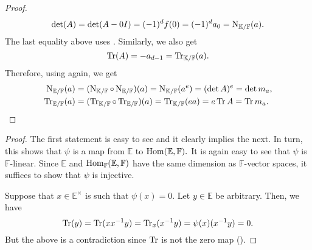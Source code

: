 \begin{proof}
    \begin{equation*} 
        \det(A) = \det(A - 0I) = (-1)^df(0) = (-1)^d a_0 = \operatorname{N}_{\mathbb{K}/\mathbb{F}}(a).
    \end{equation*}
    The last equality above uses . Similarly, we also get
    \begin{equation*} 
        \operatorname{Tr}(A) = -a_{d - 1} = \operatorname{Tr}_{\mathbb{K}/\mathbb{F}}(a).
    \end{equation*}
    Therefore, using  again, we get
    \begin{align*} 
        \operatorname{N}_{\mathbb{E}/\mathbb{F}}(a) &= (\operatorname{N}_{\mathbb{K}/\mathbb{F}} \circ \operatorname{N}_{\mathbb{E}/\mathbb{F}})(a) = \operatorname{N}_{\mathbb{K}/\mathbb{F}}(a^e) = (\det A)^e = \det m_a, \\
        \operatorname{Tr}_{\mathbb{E}/\mathbb{F}}(a) &= (\operatorname{Tr}_{\mathbb{K}/\mathbb{F}} \circ \operatorname{Tr}_{\mathbb{E}/\mathbb{F}})(a) = \operatorname{Tr}_{\mathbb{K}/\mathbb{F}}(ea) = e \operatorname{Tr} A = \operatorname{Tr} m_a. \qedhere
    \end{align*}
\end{proof}

\tracebilinearmaps*\label{prop:tracebilinearmaps2}
\begin{flushright}\hyperref[prop:tracebilinearmaps]{\upsym}\end{flushright}
\begin{proof}
    The first statement is easy to see and it clearly implies the next. In turn, this shows that $\psi$ is a map from $\mathbb{E}$ to $\operatorname{Hom}(\mathbb{E}, \mathbb{F}).$ It is again easy to see that $\psi$ is $\mathbb{F}$-linear. Since $\mathbb{E}$ and $\operatorname{Hom}_{\mathbb{F}}(\mathbb{E}, \mathbb{F})$ have the same dimension as $\mathbb{F}$-vector spaces, it suffices to show that $\psi$ is injective.

    Suppose that $x \in \mathbb{E}^\times$ is such that $\psi(x) = 0.$ Let $y \in \mathbb{E}$ be arbitrary. Then, we have
    \begin{equation*} 
        \operatorname{Tr}(y) = \operatorname{Tr}(xx^{-1}y) = \operatorname{Tr}_x(x^{-1}y) = \psi(x)(x^{-1}y) = 0.
    \end{equation*}
    But the above is a contradiction since $\operatorname{Tr}$ is not the zero map ().
\end{proof}

